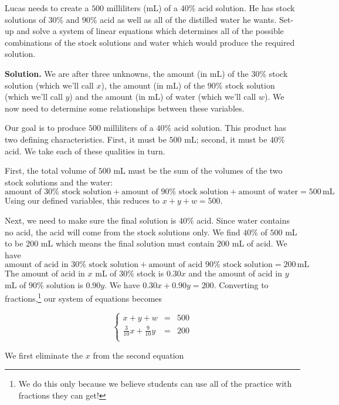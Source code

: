 \begin{ex} \label{lucasmixex} Lucas needs to create a $500$ milliliters (mL) of a $40 \%$ acid solution.  He has stock solutions of $30 \%$ and $90 \%$ acid as well as all of the distilled water he wants. Set-up and solve a system of linear equations which determines all of the possible combinations of the stock solutions and water which would produce the required solution.

\smallskip

{ \bf Solution.}  We are after three unknowns, the amount (in mL) of the $30 \%$ stock solution (which we'll call $x$), the amount (in mL) of the $90 \%$ stock solution (which we'll call $y$) and the amount (in mL) of water (which we'll call $w$). We now need to determine some relationships between these variables.  

Our goal is to produce $500$ milliliters of a $40 \%$ acid solution.  This product has two defining characteristics.  First, it must be $500$ mL;  second, it must be $40 \%$ acid.  We take each of these qualities in turn.  

First, the total volume of $500$ mL must be the sum of the volumes of the two stock solutions and the water: \[ \mbox{amount of  $30 \%$ stock solution} + \mbox{amount of  $90 \%$ stock solution} + \mbox{amount of water} = 500 \, \mbox{mL}\] Using our defined variables, this reduces to $x+y+w = 500$.  

Next, we need to make sure the final solution is $40 \%$ acid.   Since water contains no acid, the acid will come from the stock solutions only.  We find $40 \%$ of $500$ mL to be $200$ mL which means the final solution must contain $200$ mL of acid.  We have \[ \mbox{amount of  acid in $30 \%$ stock solution} + \mbox{amount of acid $90 \%$ stock solution}  = 200 \, \mbox{mL}\]  The amount of acid in  $x$ mL of $30 \%$ stock is $0.30x$ and the amount of acid in $y$ mL of $90 \%$ solution is $0.90y$.  We have $0.30x + 0.90y = 200$.  Converting to fractions,\footnote{We do this only because we believe students can use all of the practice with fractions they can get!} our system of equations becomes 

\[ \left\{ \begin{array}{rcl} x+y+w & = & 500 \\ 
\frac{3}{10}x + \frac{9}{10}y & = & 200 \\ \end{array} \right.\]  

We first eliminate the $x$ from the second equation 


\end{ex}
